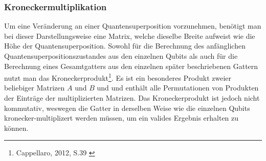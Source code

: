 \documentclass[12pt]{report}
\begin{document}
\subsubsection{Kroneckermultiplikation}						%
Um eine Veränderung an einer Quantensuperposition vorzunehmen, benötigt man bei dieser Darstellungsweise eine Matrix, welche dieselbe Breite aufweist wie die Höhe der Quantensuperposition. Sowohl für die Berechnung des anfänglichen Quantensuperpositionszustandes aus den einzelnen Qubits als auch für die Berechnung eines Gesamtgatters aus den einzelnen später beschriebenen Gattern nutzt man das Kroneckerprodukt\footnote{Cappellaro, 2012, S.39 \cite{p221-3}}.
Es ist ein besonderes Produkt zweier beliebiger Matrizen $A$ und $B$ und und enthält alle Permutationen von Produkten der Einträge der multiplizierten Matrizen. Das Kroneckerprodukt ist jedoch nicht kommutativ, weswegen die Gatter in derselben Weise wie die einzelnen Qubits kronecker-multiplizert werden müssen, um ein valides Ergebnis erhalten zu können.\\
\end{document}
